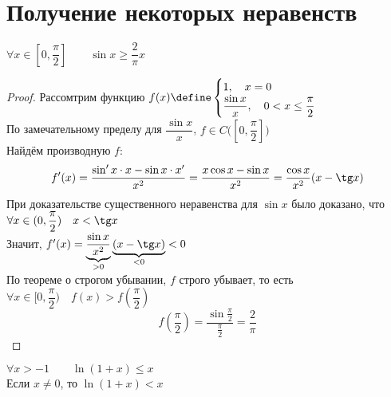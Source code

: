 \section{Получение некоторых неравенств}

\begin{statement}
	$ \forall x \in [0, \dfrac\pi2] \qquad \sin x \ge \dfrac2\pi x $
\end{statement}

\begin{proof}
	Рассомтрим функцию $ f(x) \define
    \begin{cases}
    	1, \quad x = 0 \\
        \dfrac{\sin x}x, \quad 0 < x \le \dfrac\pi2
    \end{cases} $ \\
    По замечательному пределу для $ \dfrac{\sin x}x $, $ f \in C \big( [0, \dfrac\pi2] \big) $ \\
    Найдём производную $f$:
    $$ f'(x) = \frac{\sin' x \cdot x - \sin x \cdot x'}{x^2} = \frac{x \cos x - \sin x}{x^2} = \frac{\cos x}{x^2} (x - \tg x) $$
    При доказательстве существенного неравенства для $\sin x$ было доказано, что $ \forall x \in (0, \dfrac\pi2) \quad x < \tg x $ \\
    Значит, $ f'(x) = \underbrace{\dfrac{\sin x}{x^2}}_{> 0} \underbrace{(x - \tg x)}_{ < 0} < 0 $ \\
    По теореме о строгом убывании, $f$ строго убывает, то есть $ \forall x \in [0, \dfrac\pi2) \quad f(x) > f(\dfrac\pi2) $
    $$ f(\frac\pi2) = \frac{\sin \frac\pi2}{\frac\pi2} = \frac2\pi $$
\end{proof}

\begin{statement}
	$ \forall x > -1 \qquad \ln (1 + x) \le x $ \\
    Если $x \ne 0$, то $ \ln (1 + x) < x $
\end{statement}


